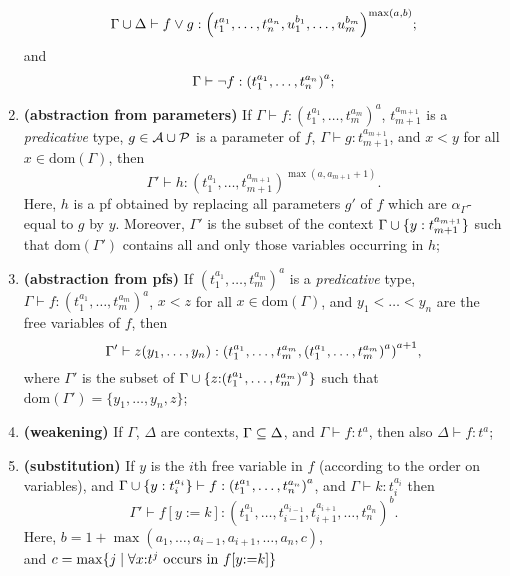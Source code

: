\documentclass{article}
\begin{document}
\begin{enumerate}
$$\Gamma\cup\Delta\vdash f\vee g :
        {\left( t_1^{a_1},\dots,t_n^{a_n},u_1^{b_1},\dots,u_m^{b_m}\right)}^
        {\max(a,b)};$$ and 
        $$\Gamma\vdash\neg f : {(t_1^{a_1},\dots,t_n^{a_n})}^a;$$
\item\label{rtt3} {\bf (abstraction from parameters)}
        If $\Gamma\vdash f:{(t_1^{a_1},\dots,t_m^{a_m})}^a$,
        $t_{m+1}^{a_{m+1}}$ is a {\em predicative}\/
        type,
        $g\in{\cal A}\cup{\cal P}$ is a parameter of $f$,
        $\Gamma\vdash g:t_{m+1}^{a_{m+1}}$,
        and $x<y$ for all $x\in\mbox{dom}(\Gamma)$, then
        $$\Gamma'\vdash h:
                {(t_1^{a_1},\dots,t_{m+1}^{a_{m+1}})}^{\max(a,a_{m+1}+1)}.$$
        Here, $h$ is a pf obtained by replacing all parameters $g'$ of $f$
        which are $\alpha_{\Gamma}$-equal to $g$ by $y$.
        Moreover, $\Gamma'$ is the subset of the context
        $\Gamma\cup\{y:t_{m+1}^{a_{m+1}}\}$ such that $\mbox{dom}(\Gamma')$
        contains all and only those variables occurring in
        $h$;
\item\label{rtt4} {\bf (abstraction from pfs)}
        If $(t_1^{a_1},\dots,t_m^{a_m})^a$ is a {\em predicative}\/
        type,
        $\Gamma\vdash f:{(t_1^{a_1},\dots,t_m^{a_m})}^a$,
        $x<z$ for all $x\in\mbox{dom}(\Gamma)$,
        and $y_1<\dots<y_n$ are the free variables of $f$, then
        $$\Gamma'\vdash z(y_1,\dots,y_n) :
        {\left( t_1^{a_1},\dots,t_m^{a_m},{\left( t_1^{a_1},\dots,
                t_m^{a_m}\right) }^a\right) }^{a+1},$$
        where $\Gamma'$ is the subset of $\Gamma\cup
        \{z{:}{(t_1^{a_1},\dots,t_m^{a_m})}^a\}$ such that
        $\mbox{dom}(\Gamma')=
        \{y_1,\dots,y_n,z\}$;
\item\label{rtt5} {\bf (weakening)}
        If $\Gamma$, $\Delta$ are contexts, $\Gamma\subseteq\Delta$,
        and $\Gamma\vdash f:t^a$, then also $\Delta\vdash f:t^a$;
\item\label{rtt6} {\bf (substitution)}
        If $y$ is the $i$th free variable in $f$ (according to
        the order on variables), and $\Gamma\cup\{y:t_i^{a_i}\}\vdash
        f:{(t_1^{a_1},\dots,t_n^{a_n})}^a$, and $\Gamma\vdash k:t_i^{a_i}$
        then $$\Gamma'\vdash f[y{:=}k] : {(t_1^{a_1},\dots,t_{i-1}^{a_{i-1}},
        t_{i+1}^{a_{i+1}},\dots,t_n^{a_n})}^b.$$
        Here, $b=1+\max(a_1,\dots,a_{i-1},a_{i+1},\dots,a_n,c)$,\\ and
        $c=\max\{j\mid \forall x{:}t^j\mbox{ occurs in } f[y{:=}k]\}$ 


\end{enumerate}
\end{document}
